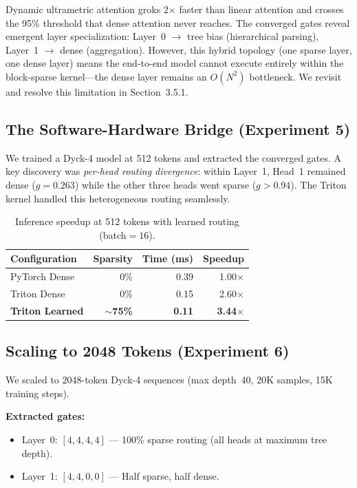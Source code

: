\documentclass[11pt,a4paper]{article}
\begin{document}
Dynamic ultrametric attention groks 2$\times$ faster than linear attention and crosses the 95\% threshold that dense attention never reaches. The converged gates reveal emergent layer specialization: Layer~0 $\to$ tree bias (hierarchical parsing), Layer~1 $\to$ dense (aggregation). However, this hybrid topology (one sparse layer, one dense layer) means the end-to-end model cannot execute entirely within the block-sparse kernel---the dense layer remains an $O(N^2)$ bottleneck. We revisit and resolve this limitation in Section~3.5.1.

\subsection{The Software-Hardware Bridge (Experiment 5)}

We trained a Dyck-4 model at 512 tokens and extracted the converged gates. A key discovery was \emph{per-head routing divergence}: within Layer~1, Head~1 remained dense ($g = 0.263$) while the other three heads went sparse ($g > 0.94$). The Triton kernel handled this heterogeneous routing seamlessly.

\begin{table}[h]
\centering
\caption{Inference speedup at 512 tokens with learned routing (batch$=16$).}
\label{tab:bridge512}
\begin{tabular}{@{}lrrr@{}}
\toprule
Configuration & Sparsity & Time (ms) & Speedup \\
\midrule
PyTorch Dense           & 0\%    & 0.39 & 1.00$\times$ \\
Triton Dense            & 0\%    & 0.15 & 2.60$\times$ \\
\textbf{Triton Learned} & \textbf{$\sim$75\%} & \textbf{0.11} & \textbf{3.44$\times$} \\
\bottomrule
\end{tabular}
\end{table}

\subsection{Scaling to 2048 Tokens (Experiment 6)}

We scaled to 2048-token Dyck-4 sequences (max depth~40, 20K samples, 15K training steps).

\textbf{Extracted gates:}
\begin{itemize}
    \item Layer~0: $[4, 4, 4, 4]$ --- 100\% sparse routing (all heads at maximum tree depth).
    \item Layer~1: $[4, 4, 0, 0]$ --- Half sparse, half dense.
\end{itemize}
\end{document}

